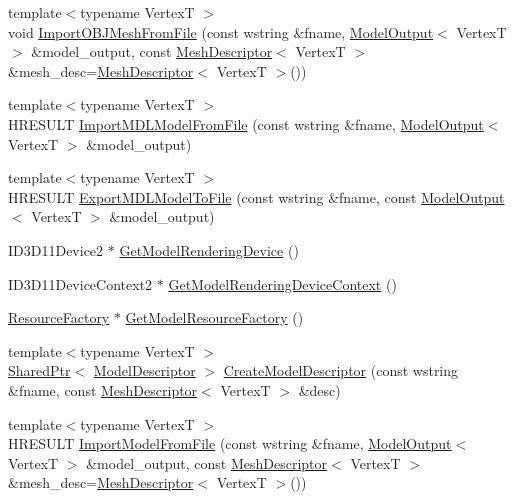\begin{DoxyCompactItemize}
{\footnotesize template$<$typename VertexT $>$ }\\void \hyperlink{namespacemage_abeaf36b602f5ed971b1b505e42972e4f}{Import\+O\+B\+J\+Mesh\+From\+File} (const wstring \&fname, \hyperlink{structmage_1_1_model_output}{Model\+Output}$<$ VertexT $>$ \&model\+\_\+output, const \hyperlink{structmage_1_1_mesh_descriptor}{Mesh\+Descriptor}$<$ VertexT $>$ \&mesh\+\_\+desc=\hyperlink{structmage_1_1_mesh_descriptor}{Mesh\+Descriptor}$<$ VertexT $>$())
\item 
{\footnotesize template$<$typename VertexT $>$ }\\H\+R\+E\+S\+U\+LT \hyperlink{namespacemage_a3f0f8c54f76f76ed7081fd3c960e482d}{Import\+M\+D\+L\+Model\+From\+File} (const wstring \&fname, \hyperlink{structmage_1_1_model_output}{Model\+Output}$<$ VertexT $>$ \&model\+\_\+output)
\item 
{\footnotesize template$<$typename VertexT $>$ }\\H\+R\+E\+S\+U\+LT \hyperlink{namespacemage_a111dc6972bce8645df185fa5a65f9bff}{Export\+M\+D\+L\+Model\+To\+File} (const wstring \&fname, const \hyperlink{structmage_1_1_model_output}{Model\+Output}$<$ VertexT $>$ \&model\+\_\+output)
\item 
I\+D3\+D11\+Device2 $\ast$ \hyperlink{namespacemage_aca16dcb4637f074bb6e33d4ba7929686}{Get\+Model\+Rendering\+Device} ()
\item 
I\+D3\+D11\+Device\+Context2 $\ast$ \hyperlink{namespacemage_a1d373a08e09ec19944bf23feb4688b7e}{Get\+Model\+Rendering\+Device\+Context} ()
\item 
\hyperlink{classmage_1_1_resource_factory}{Resource\+Factory} $\ast$ \hyperlink{namespacemage_a51b4df46661a9038c0d2a14cb3fbe483}{Get\+Model\+Resource\+Factory} ()
\item 
{\footnotesize template$<$typename VertexT $>$ }\\\hyperlink{namespacemage_a1e01ae66713838a7a67d30e44c67703e}{Shared\+Ptr}$<$ \hyperlink{classmage_1_1_model_descriptor}{Model\+Descriptor} $>$ \hyperlink{namespacemage_a8cc26f80d3cb6f3d457bb06942880d84}{Create\+Model\+Descriptor} (const wstring \&fname, const \hyperlink{structmage_1_1_mesh_descriptor}{Mesh\+Descriptor}$<$ VertexT $>$ \&desc)
\item 
{\footnotesize template$<$typename VertexT $>$ }\\H\+R\+E\+S\+U\+LT \hyperlink{namespacemage_abc1dfdc85895f4f5fcb6acf5fafd7e27}{Import\+Model\+From\+File} (const wstring \&fname, \hyperlink{structmage_1_1_model_output}{Model\+Output}$<$ VertexT $>$ \&model\+\_\+output, const \hyperlink{structmage_1_1_mesh_descriptor}{Mesh\+Descriptor}$<$ VertexT $>$ \&mesh\+\_\+desc=\hyperlink{structmage_1_1_mesh_descriptor}{Mesh\+Descriptor}$<$ VertexT $>$())

\end{DoxyCompactItemize}
